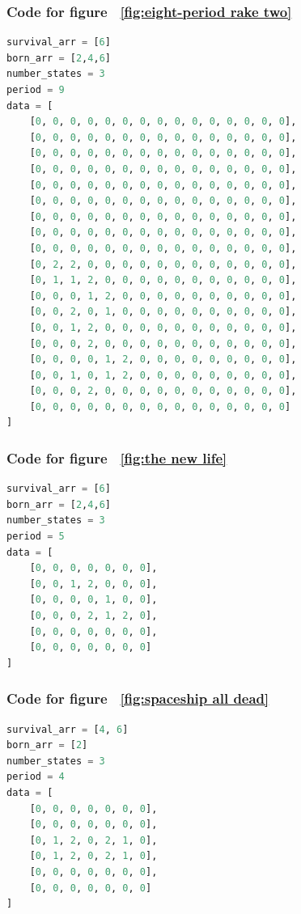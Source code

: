 \documentclass[12pt]{article}
\numberwithin{figure}{section} %
\begin{document}
\subsubsection{Code for figure ~\ref{fig:eight-period rake two}}
\label{subsubsection:eight-period rake two}
\begin{lstlisting}[language = Python]
survival_arr = [6]
born_arr = [2,4,6]
number_states = 3
period = 9
data = [
    [0, 0, 0, 0, 0, 0, 0, 0, 0, 0, 0, 0, 0, 0, 0],
    [0, 0, 0, 0, 0, 0, 0, 0, 0, 0, 0, 0, 0, 0, 0],
    [0, 0, 0, 0, 0, 0, 0, 0, 0, 0, 0, 0, 0, 0, 0],
    [0, 0, 0, 0, 0, 0, 0, 0, 0, 0, 0, 0, 0, 0, 0],
    [0, 0, 0, 0, 0, 0, 0, 0, 0, 0, 0, 0, 0, 0, 0],
    [0, 0, 0, 0, 0, 0, 0, 0, 0, 0, 0, 0, 0, 0, 0],
    [0, 0, 0, 0, 0, 0, 0, 0, 0, 0, 0, 0, 0, 0, 0],
    [0, 0, 0, 0, 0, 0, 0, 0, 0, 0, 0, 0, 0, 0, 0],
    [0, 0, 0, 0, 0, 0, 0, 0, 0, 0, 0, 0, 0, 0, 0],
    [0, 2, 2, 0, 0, 0, 0, 0, 0, 0, 0, 0, 0, 0, 0],
    [0, 1, 1, 2, 0, 0, 0, 0, 0, 0, 0, 0, 0, 0, 0],
    [0, 0, 0, 1, 2, 0, 0, 0, 0, 0, 0, 0, 0, 0, 0],
    [0, 0, 2, 0, 1, 0, 0, 0, 0, 0, 0, 0, 0, 0, 0],
    [0, 0, 1, 2, 0, 0, 0, 0, 0, 0, 0, 0, 0, 0, 0],
    [0, 0, 0, 2, 0, 0, 0, 0, 0, 0, 0, 0, 0, 0, 0],
    [0, 0, 0, 0, 1, 2, 0, 0, 0, 0, 0, 0, 0, 0, 0],
    [0, 0, 1, 0, 1, 2, 0, 0, 0, 0, 0, 0, 0, 0, 0],
    [0, 0, 0, 2, 0, 0, 0, 0, 0, 0, 0, 0, 0, 0, 0],
    [0, 0, 0, 0, 0, 0, 0, 0, 0, 0, 0, 0, 0, 0, 0]
]
\end{lstlisting}

\noindent\begin{minipage}{.45\textwidth}
\subsubsection{Code for figure ~\ref{fig:the new life}}
\label{subsubsection:the new life}
\begin{lstlisting}[language = Python]
survival_arr = [6]
born_arr = [2,4,6]
number_states = 3
period = 5
data = [
    [0, 0, 0, 0, 0, 0, 0],
    [0, 0, 1, 2, 0, 0, 0],
    [0, 0, 0, 0, 1, 0, 0],
    [0, 0, 0, 2, 1, 2, 0],
    [0, 0, 0, 0, 0, 0, 0],
    [0, 0, 0, 0, 0, 0, 0]
]
\end{lstlisting}
\end{minipage}\hfill
\begin{minipage}{.5\textwidth}
\subsubsection{Code for figure ~\ref{fig:spaceship all dead}}
\label{subsubsection:spaceship all dead}
\begin{lstlisting}[language = Python]
survival_arr = [4, 6]
born_arr = [2]
number_states = 3
period = 4
data = [
    [0, 0, 0, 0, 0, 0, 0],
    [0, 0, 0, 0, 0, 0, 0],
    [0, 1, 2, 0, 2, 1, 0],
    [0, 1, 2, 0, 2, 1, 0],
    [0, 0, 0, 0, 0, 0, 0],
    [0, 0, 0, 0, 0, 0, 0]
]
\end{lstlisting}
\end{minipage}
\end{document}
